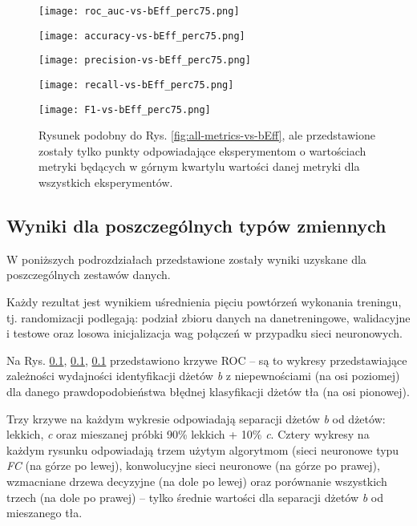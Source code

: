 \begin{figure}[h]
	\centering
	\texttt{[image: roc\_auc-vs-bEff\_perc75.png]} 
	
	\vspace{-1.5em}
	\texttt{[image: accuracy-vs-bEff\_perc75.png]}
	
	\vspace{-1.5em}
	\texttt{[image: precision-vs-bEff\_perc75.png]}
	
	\vspace{-1.5em}
	\texttt{[image: recall-vs-bEff\_perc75.png]}
	
	\vspace{-1.2em}
	\texttt{[image: F1-vs-bEff\_perc75.png]}
	
	\caption{Rysunek podobny do Rys. \ref{fig:all-metrics-vs-bEff}, ale przedstawione zostały tylko punkty odpowiadające eksperymentom o wartościach metryki będących w górnym kwartylu wartości danej metryki dla wszystkich eksperymentów.}
	\label{fig:all-metrics-vs-bEff_perc75}
\end{figure}

\clearpage

\subsection{Wyniki dla poszczególnych typów zmiennych}

W poniższych podrozdziałach przedstawione zostały wyniki uzyskane dla poszczególnych zestawów danych.

Każdy rezultat jest wynikiem uśrednienia pięciu powtórzeń wykonania treningu, tj. randomizacji podlegają: podział zbioru danych na danetreningowe, walidacyjne i testowe oraz losowa inicjalizacja wag połączeń w przypadku sieci neuronowych.

Na Rys. \ref{}, \ref{}, \ref{} przedstawiono krzywe ROC -- są to wykresy przedstawiające zależności wydajności identyfikacji dżetów \textit{b} z niepewnościami (na osi poziomej) dla danego prawdopodobieństwa błędnej klasyfikacji dżetów tła (na osi pionowej). 

Trzy krzywe na każdym wykresie odpowiadają separacji dżetów \textit{b} od dżetów: lekkich, \textit{c} oraz mieszanej próbki 90\% lekkich + 10\% \textit{c}.
Cztery wykresy na każdym rysunku odpowiadają trzem użytym algorytmom (sieci neuronowe typu \textit{FC} (na górze po lewej), konwolucyjne sieci neuronowe (na górze po prawej), wzmacniane drzewa decyzyjne (na dole po lewej) oraz porównanie wszystkich trzech (na dole po prawej) -- tylko średnie wartości dla separacji dżetów \textit{b} od mieszanego tła.

